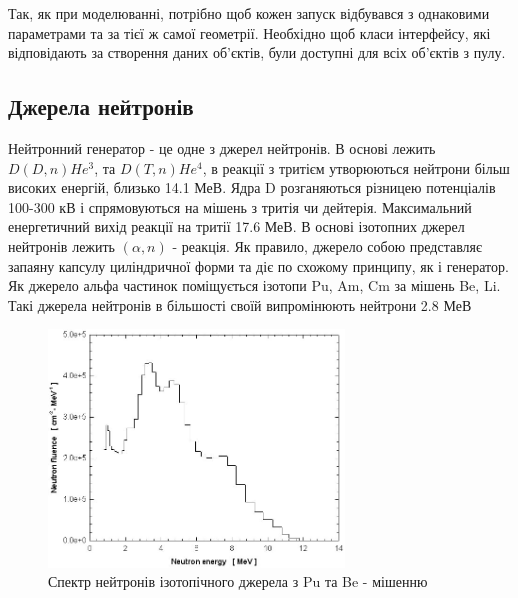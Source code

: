\documentclass[a4paper, 14pt]{article}
\numberwithin{equation}{section}
\numberwithin{table}{section}
\begin{document}
Так, як при моделюванні, потрібно щоб кожен запуск відбувався з однаковими параметрами та за тієї ж самої геометрії. Необхідно щоб класи інтерфейсу, які відповідають за створення даних об'єктів, були доступні для всіх об'єктів з пулу.
	
\subsection{Джерела нейтронів}
Нейтронний генератор - це одне з джерел нейтронів. В основі лежить $D(D,n)He^3 $, та $D(T, n)He^4$, в реакції з тритієм утворюються нейтрони більш високих енергій, близько 14.1 МеВ. Ядра D розганяються різницею потенціалів 100-300 кВ і спрямовуються на мішень з тритія чи дейтерія. Максимальний енергетичний вихід реакції на тритії 17.6 МеВ. 
В основі ізотопних джерел нейтронів лежить $(\alpha, n)$ - реакція. Як правило, джерело собою представляє запаяну капсулу циліндричної форми та діє по схожому принципу, як і генератор. Як джерело альфа частинок поміщується ізотопи Pu, Am, Cm за мішень Be, Li. Такі джерела нейтронів в більшості своїй випромінюють нейтрони 2.8 МеВ
\begin{figure}[hbt!]
	\centering \includegraphics[width=0.7\textwidth]{images/239-PuBe-neutron-source-spectrum.png}
	\caption{Спектр нейтронів ізотопічного джерела з Pu та Be - мішенню} 
	\label{ris:neutron28Spectrum}	
\end{figure}
\newpage
\end{document}
